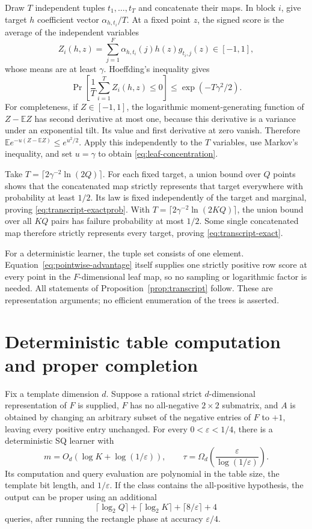 \documentclass[11pt,letterpaper,pmlr,twoside]{jmlr}
\newcommand{\E}{\mathbb E}
\newcommand{\eps}{\varepsilon}
\newcommand{\ceil}[1]{\lceil #1\rceil}
\begin{document}
Draw $T$ independent tuples $t_1,\ldots,t_T$ and concatenate their maps. In block $i$, give target $h$ coefficient vector $\alpha_{h,t_i}/T$. At a fixed point $z$, the signed score is the average of the independent variables
\[
 Z_i(h,z)=\sum_{j=1}^F\alpha_{h,t_i}(j)h(z)g_{t_i,j}(z)\in[-1,1],
\]
whose means are at least $\gamma$. Hoeffding's inequality \citep{Hoeffding63} gives
\begin{equation}
 \Pr\left[\frac1T\sum_{i=1}^TZ_i(h,z)\le0\right]
 \le\exp(-T\gamma^2/2).
 \label{eq:leaf-concentration}
\end{equation}
For completeness, if $Z\in[-1,1]$, the logarithmic moment-generating function of $Z-\E Z$ has second derivative at most one, because this derivative is a variance under an exponential tilt. Its value and first derivative at zero vanish. Therefore $\E e^{-u(Z-\E Z)}\le e^{u^2/2}$. Apply this independently to the $T$ variables, use Markov's inequality, and set $u=\gamma$ to obtain \eqref{eq:leaf-concentration}.

Take $T=\ceil{2\gamma^{-2}\ln(2Q)}$. For each fixed target, a union bound over $Q$ points shows that the concatenated map strictly represents that target everywhere with probability at least $1/2$. Its law is fixed independently of the target and marginal, proving \eqref{eq:transcript-exactprob}. With $T=\ceil{2\gamma^{-2}\ln(2KQ)}$, the union bound over all $KQ$ pairs has failure probability at most $1/2$. Some single concatenated map therefore strictly represents every target, proving \eqref{eq:transcript-exact}.

For a deterministic learner, the tuple set consists of one element. Equation~\eqref{eq:pointwise-advantage} itself supplies one strictly positive row score at every point in the $F$-dimensional leaf map, so no sampling or logarithmic factor is needed. All statements of Proposition~\ref{prop:transcript} follow. These are representation arguments; no efficient enumeration of the trees is asserted.

\section{Deterministic table computation and proper completion}
\label{app:proper}
\begin{theorem}
\label{thm:table-general}
Fix a template dimension $d$. Suppose a rational strict $d$-dimensional representation of $F$ is supplied, $F$ has no all-negative $2\times2$ submatrix, and $A$ is obtained by changing an arbitrary subset of the negative entries of $F$ to $+1$, leaving every positive entry unchanged. For every $0<\eps<1/4$, there is a deterministic SQ learner with
\[
 m=O_d\!\left(\log K+\log(1/\eps)\right),\qquad
 \tau=\Omega_d\!\left(\frac{\eps}{\log(1/\eps)}\right).
\]
Its computation and query evaluation are polynomial in the table size, the template bit length, and $1/\eps$. If the class contains the all-positive hypothesis, the output can be proper using an additional
\[
 \ceil{\log_2Q}+\ceil{\log_2K}+\ceil{8/\eps}+4
\]
queries, after running the rectangle phase at accuracy $\eps/4$.
\end{theorem}
\end{document}
